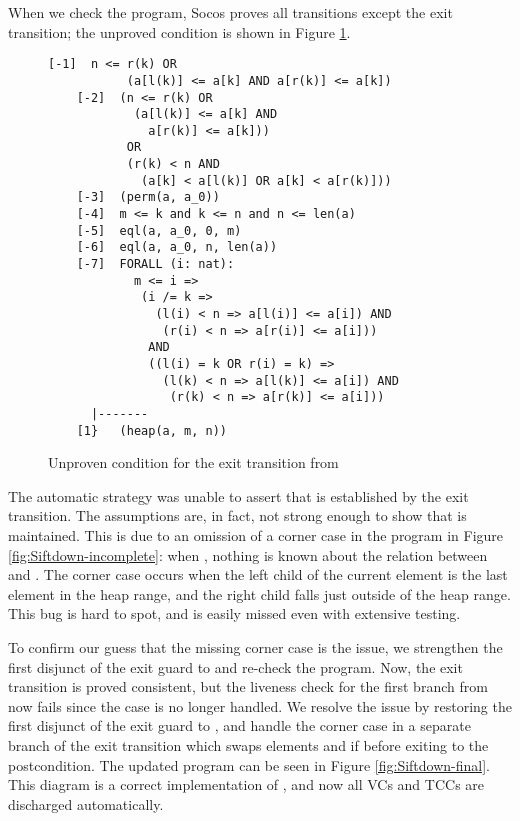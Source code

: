 \documentclass[english,submission]{eptcs}
\begin{document}
When we check the program, Socos proves all transitions
except the exit transition; the unproved condition is shown in Figure
\ref{fig:Unproved-condition-Sift}. 
\begin{figure}
\begin{lstlisting}[basicstyle={\small\ttfamily},frame=lines]
    [-1]  n <= r(k) OR
           (a[l(k)] <= a[k] AND a[r(k)] <= a[k])
    [-2]  (n <= r(k) OR
            (a[l(k)] <= a[k] AND
              a[r(k)] <= a[k]))
           OR
           (r(k) < n AND
             (a[k] < a[l(k)] OR a[k] < a[r(k)]))
    [-3]  (perm(a, a_0))
    [-4]  m <= k and k <= n and n <= len(a)
    [-5]  eql(a, a_0, 0, m)
    [-6]  eql(a, a_0, n, len(a))
    [-7]  FORALL (i: nat):
            m <= i =>
             (i /= k =>
               (l(i) < n => a[l(i)] <= a[i]) AND
                (r(i) < n => a[r(i)] <= a[i]))
              AND
              ((l(i) = k OR r(i) = k) =>
                (l(k) < n => a[l(k)] <= a[i]) AND
                 (r(k) < n => a[r(k)] <= a[i]))
      |-------
    [1}   (heap(a, m, n))
\end{lstlisting}


\caption[Unproven condition for the exit transition from .]{Unproven condition for the exit transition from 
\label{fig:Unproved-condition-Sift}}
\end{figure} 
The automatic strategy was unable to assert that
 is established by the exit transition. The
assumptions are, in fact, not strong enough to show that
 is maintained.  This is due to an omission of a
corner case in the program in Figure \ref{fig:Siftdown-incomplete}:
when , nothing is known about the relation between
 and .  The corner case occurs when
the left child of the current element is the last element in the heap
range, and the right child falls just outside of the heap range.  This
bug is hard to spot, and is easily missed even with extensive testing.

To confirm our guess that the missing corner case is the issue, we
strengthen the first disjunct of the exit guard to 
and re-check the program. Now, the exit transition is proved
consistent, but the liveness check for the first branch from
 now fails since the case  is no
longer handled. We resolve the issue by restoring the first disjunct
of the exit guard to , and handle the corner case
in a separate branch of the exit transition which swaps elements
 and  if  before
exiting to the postcondition. The updated program can be seen in
Figure \ref{fig:Siftdown-final}.  This diagram is a correct
implementation of , and now all VCs and TCCs are
discharged automatically.
\end{document}
